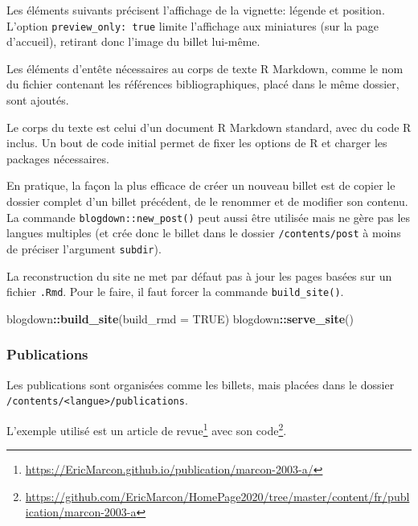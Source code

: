 \documentclass[
  12pt,
  french,
  a4paper,
  extrafontsizes,onecolumn,openright
  ]{memoir}
\newenvironment{Shaded}{\begin{snugshade}}{\end{snugshade}}
\newcommand{\DataTypeTok}[1]{\textcolor[rgb]{0.13,0.29,0.53}{#1}}
\newcommand{\KeywordTok}[1]{\textcolor[rgb]{0.13,0.29,0.53}{\textbf{#1}}}
\newcommand{\NormalTok}[1]{#1}
\newcommand{\OperatorTok}[1]{\textcolor[rgb]{0.81,0.36,0.00}{\textbf{#1}}}
\newcommand{\OtherTok}[1]{\textcolor[rgb]{0.56,0.35,0.01}{#1}}
\begin{document}
Les éléments suivants précisent l'affichage de la vignette: légende et position.
L'option \texttt{preview\_only:\ true} limite l'affichage aux miniatures (sur la page d'accueil), retirant donc l'image du billet lui-même.

Les éléments d'entête nécessaires au corps de texte R Markdown, comme le nom du fichier contenant les références bibliographiques, placé dans le même dossier, sont ajoutés.

Le corps du texte est celui d'un document R Markdown standard, avec du code R inclus.
Un bout de code initial permet de fixer les options de R et charger les packages nécessaires.

En pratique, la façon la plus efficace de créer un nouveau billet est de copier le dossier complet d'un billet précédent, de le renommer et de modifier son contenu.
La commande \texttt{blogdown::new\_post()} peut aussi être utilisée mais ne gère pas les langues multiples (et crée donc le billet dans le dossier \texttt{/contents/post} à moins de préciser l'argument \texttt{subdir}).

La reconstruction du site ne met par défaut pas à jour les pages basées sur un fichier \texttt{.Rmd}.
Pour le faire, il faut forcer la commande \texttt{build\_site()}.

\scriptsize

\begin{Shaded}
\begin{Highlighting}[]
\NormalTok{blogdown}\OperatorTok{::}\KeywordTok{build_site}\NormalTok{(}\DataTypeTok{build_rmd =} \OtherTok{TRUE}\NormalTok{)}
\NormalTok{blogdown}\OperatorTok{::}\KeywordTok{serve_site}\NormalTok{()}
\end{Highlighting}
\end{Shaded}

\normalsize

\hypertarget{publications}{%
\subsubsection{Publications}\label{publications}}

Les publications sont organisées comme les billets, mais placées dans le dossier \texttt{/contents/\textless{}langue\textgreater{}/publications}.

L'exemple utilisé est un article de revue\footnote{\url{https://EricMarcon.github.io/publication/marcon-2003-a/}} avec son code\footnote{\url{https://github.com/EricMarcon/HomePage2020/tree/master/content/fr/publication/marcon-2003-a}}.
\end{document}
